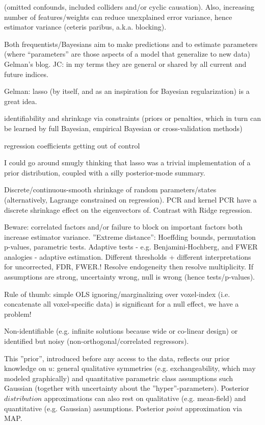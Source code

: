\documentclass{article}
\begin{document}
(omitted confounds, included colliders and/or cyclic causation). Also, increasing number of features/weights can reduce unexplained error variance, hence estimator variance (ceteris paribus, a.k.a. blocking).


Both frequentists/Bayesians aim to make predictions and to estimate parameters (where “parameters” are those aspects of a model that generalize to new data) Gelman's blog. JC: in my terms they are general or shared by all current and future indices. 

Gelman: lasso (by itself, and as an inspiration for Bayesian regularization) is a great idea.

identifiability and shrinkage via constraints (priors or penalties, which in turn can be learned by full Bayesian, empirical Bayesian or cross-validation methods)

regression coefficients getting out of control

I could go around smugly thinking that lasso was a trivial implementation of a prior distribution, coupled with a silly posterior-mode summary.

Discrete/continuous-smooth shrinkage of random parameters/states (alternatively, Lagrange constrained on regression). PCR and kernel PCR have a discrete shrinkage effect on the eigenvectors of. Contrast with Ridge regression.

Beware: correlated factors and/or failure to block on important factors both increase estimator variance. ''Extreme distance'': Hoeffding bounds, permutation p-values, parametric tests. Adaptive tests - e.g. Benjamini-Hochberg, and FWER analogies - adaptive estimation. Different thresholds + different interpretations for uncorrected, FDR, FWER.! Resolve endogeneity then resolve multiplicity. If assumptions are strong, uncertainty wrong, null is wrong (hence tests/p-values).

Rule of thumb: simple OLS ignoring/marginalizing over voxel-index (i.e. concatenate all voxel-specific data) is significant for a null effect, we have a problem!

Non-identifiable (e.g. infinite solutions because wide or co-linear design) or identified but noisy (non-orthogonal/correlated regressors).

This ”prior”, introduced before any access to the data, reflects our prior knowledge on $u$: general qualitative symmetries (e.g. exchangeability, which may modeled graphically) and quantitative parametric class assumptions such Gaussian (together with uncertainty about the ''hyper''-parameters). Posterior $distribution$ approximations can also rest on qualitative (e.g. mean-field) and quantitative (e.g. Gaussian) assumptions. Posterior $point$ approximation via MAP.
\end{document}
